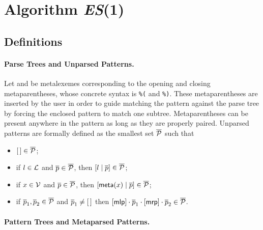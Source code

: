 
\section{Algorithm \textit{ES}(1)}
\label{es1}

\subsection{Definitions}
\label{es1:def}

\paragraph{Parse Trees and Unparsed Patterns.}

Let \mlp and \mrp be meta\-lexemes corresponding to the opening and
closing meta\-parentheses, whose concrete syntax is \texttt{\%(} and
\texttt{\%)}. These meta\-parentheses are inserted by the user in
order to guide matching the pattern against the parse tree by forcing
the enclosed pattern to match one subtree. Meta\-parentheses can be
present anywhere in the pattern as long as they are properly
paired. Unparsed patterns are formally defined as the smallest set
\(\overline{\cal P}\) such that
\begin{itemize}

  \item \([\,] \in \overline{\cal P}\);

  \item if \(l \in {\cal L}\) and \(\overline{p} \in \overline{\cal
    P}\), then \([{l}\mid{\overline{p}}] \in \overline{\cal P}\);

  \item if \(x \in {\cal V}\) and \(\overline{p} \in \overline{\cal
    P}\), then \([{\textsf{meta}(x)}\mid{\overline{p}}] \in \overline{\cal
    P}\);

  \item if \(\overline{p}_1, \overline{p}_2 \in \overline{\cal P}\)
    and \(\overline{p}_1 \neq [\,]\) then \([\textsf{mlp}] \cdot \overline{p}_1
    \cdot [\textsf{mrp}] \cdot \overline{p}_2 \in \overline{\cal P}\).

\end{itemize}

\paragraph{Pattern Trees and Meta\-parsed Patterns.}

